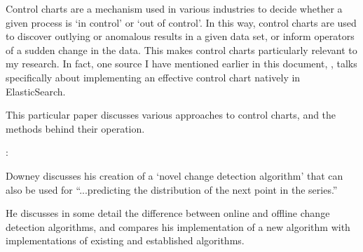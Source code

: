 \documentclass{uvamscse}
\begin{document}
\noindent Control charts are a mechanism used in various industries to decide whether a given process is `in control' or `out of control'. In this way, control charts are used to discover outlying or anomalous results in a given data set, or inform operators of a sudden change in the data. This makes control charts particularly relevant to my research. In fact, one source I have mentioned earlier in this document, \cite{ESMovingAverages}, talks specifically about implementing an effective control chart natively in ElasticSearch.

This particular paper discusses various approaches to control charts, and the methods behind their operation.\bigskip

\noindent\cite{downey2008novel}: \textbf{}\smallskip

\noindent Downey discusses his creation of a `novel change detection algorithm' that can also be used for ``...predicting the distribution of the next point in the series.''\cite{downey2008novel}

He discusses in some detail the difference between online and offline change detection algorithms, and compares his implementation of a new algorithm with implementations of existing and established algorithms.

\printbibliography
\end{document}
